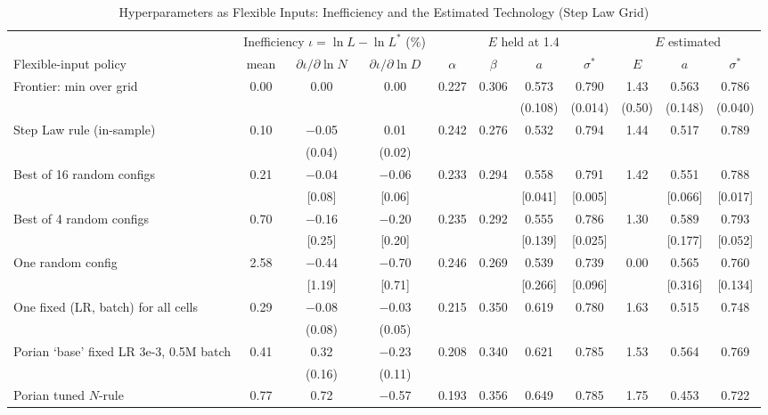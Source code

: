 \begin{table}[htbp]
\centering
\scriptsize
\setlength{\tabcolsep}{3pt}
\begin{threeparttable}
\caption{Hyperparameters as Flexible Inputs: Inefficiency and the Estimated Technology (Step Law Grid)}
\label{tab:m8_steplaw}
\begin{tabular}{lcccccccccc}
\toprule
 & \multicolumn{3}{c}{Inefficiency $\iota=\ln L-\ln L^*$ (\%)} & \multicolumn{4}{c}{$E$ held at 1.4} & \multicolumn{3}{c}{$E$ estimated} \\
\cmidrule(lr){2-4}\cmidrule(lr){5-8}\cmidrule(lr){9-11}
Flexible-input policy & mean & $\partial\iota/\partial\ln N$ & $\partial\iota/\partial\ln D$ & $\alpha$ & $\beta$ & $a$ & $\sigma^*$ & $E$ & $a$ & $\sigma^*$ \\
\midrule
Frontier: min over grid & 0.00 & 0.00 & 0.00 & 0.227 & 0.306 & 0.573 & 0.790 & 1.43 & 0.563 & 0.786 \\
 & & & & & & (0.108) & (0.014) & (0.50) & (0.148) & (0.040) \\
Step Law rule (in-sample) & 0.10 & $-$0.05 & 0.01 & 0.242 & 0.276 & 0.532 & 0.794 & 1.44 & 0.517 & 0.789 \\
 & & (0.04) & (0.02) & & & & & & &  \\
Best of 16 random configs & 0.21 & $-$0.04 & $-$0.06 & 0.233 & 0.294 & 0.558 & 0.791 & 1.42 & 0.551 & 0.788 \\
 & & [0.08] & [0.06] & & & [0.041] & [0.005] & & [0.066] & [0.017] \\
Best of 4 random configs & 0.70 & $-$0.16 & $-$0.20 & 0.235 & 0.292 & 0.555 & 0.786 & 1.30 & 0.589 & 0.793 \\
 & & [0.25] & [0.20] & & & [0.139] & [0.025] & & [0.177] & [0.052] \\
One random config & 2.58 & $-$0.44 & $-$0.70 & 0.246 & 0.269 & 0.539 & 0.739 & 0.00 & 0.565 & 0.760 \\
 & & [1.19] & [0.71] & & & [0.266] & [0.096] & & [0.316] & [0.134] \\
One fixed (LR, batch) for all cells & 0.29 & $-$0.08 & $-$0.03 & 0.215 & 0.350 & 0.619 & 0.780 & 1.63 & 0.515 & 0.748 \\
 & & (0.08) & (0.05) & & & & & & &  \\
Porian `base' fixed LR 3e-3, 0.5M batch & 0.41 & 0.32 & $-$0.23 & 0.208 & 0.340 & 0.621 & 0.785 & 1.53 & 0.564 & 0.769 \\
 & & (0.16) & (0.11) & & & & & & &  \\
Porian tuned $N$-rule & 0.77 & 0.72 & $-$0.57 & 0.193 & 0.356 & 0.649 & 0.785 & 1.75 & 0.453 & 0.722 \\

\end{tabular}
\end{threeparttable}
\end{table}
